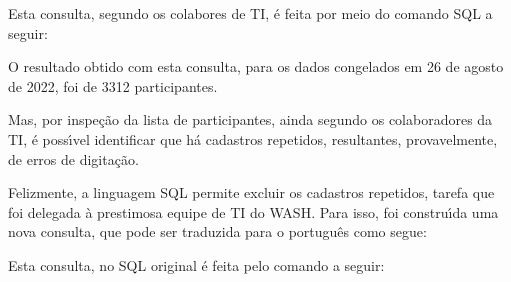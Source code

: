 \documentclass[
12pt,		%
openright,	%
twoside,  %
a4paper,			%
chapter=TITLE,		%
english,			%
french,				%
spanish,			%
brazil				%
]{USPSC-classe/USPSC_RedarTex}
\begin{document}
Esta consulta, segundo os colabores de TI, \'e feita por meio do comando SQL a seguir:









\noindent\begin{center}\mbox{\centering{}}\end{center}











O resultado obtido com esta consulta, para os dados congelados em 26 de agosto de 2022, foi de 3312 participantes.








Mas, por inspe\c{c}\~ao da lista de participantes, ainda segundo os colaboradores da TI, \'e poss\'{\i}vel identificar que h\'a cadastros repetidos, resultantes, provavelmente, de erros de digita\c{c}\~ao.








Felizmente, a linguagem SQL permite excluir os cadastros repetidos, tarefa que foi delegada \`a prestimosa equipe de TI do WASH. Para isso, foi constru\'{\i}da uma nova consulta, que pode ser traduzida para o portugu\^es como segue:









\noindent\begin{center}\mbox{\centering{}}\end{center}











Esta consulta, no SQL original \'e feita pelo comando a seguir:
\end{document}
